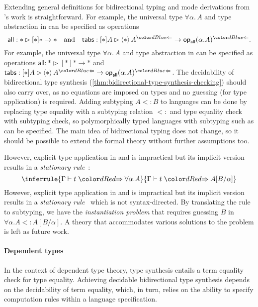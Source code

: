 Extending general definitions for bidirectional typing and mode derivations from \citeauthor{Hamana2011}'s work is straightforward. 
\ifarxiv
For example, the universal type $\forall \alpha.\, A$ and type abstraction in \SystemF can be specified as operations
\[
  \mathsf{all} : * \rhd [*] * \to *
  \quad\text{and}\quad
  \mathsf{tabs} : [*] A \rhd \left< * \right> A^{\chk} \to \tyOp_{\mathsf{all}}(\alpha. A)^{\chk}.
\]
\else
For example, the universal type $\forall \alpha.\, A$ and type abstraction in \SystemF can be specified as operations $\mathsf{all} : * \rhd [*] * \to *$ and $\mathsf{tabs} : [*] A \rhd \left< * \right> A^{\chk} \to \tyOp_{\mathsf{all}}(\alpha. A)^{\chk}$.
\fi
The decidability of bidirectional type synthesis (\cref{thm:bidirectional-type-synthesis-checking}) should also carry over, as no equations are imposed on types and no guessing (for type application) is required.
Adding subtyping $A \mathrel{<:} B$ to languages can be done by replacing type equality with a subtyping relation $\mathrel{<:}$ and type equality check with subtyping check, so polymorphically typed languages with subtyping such as \SystemFsub can be specified.
The main idea of bidirectional typing does not change, so it should be possible to extend the formal theory without further assumptions too.

\ifarxiv
However, explicit type application in \SystemF and \SystemFsub is impractical but its implicit version results in a \emph{stationary rule}~\cite{Leivant1986}:
\[
  \inferrule{\Gamma \vdash t \syn \forall \alpha. A}{\Gamma \vdash t \syn A[B/\alpha]}
\]
\else
However, explicit type application in \SystemF and \SystemFsub is impractical but its implicit version results in a \emph{stationary rule}~\cite{Leivant1986}
\fi
which is not syntax-directed.
By translating the rule to subtyping, we have the \emph{instantiation problem} that requires guessing $B$ in $\forall \alpha. A <: A[B/\alpha]$.
A theory that accommodates various solutions to the problem is left as future work.

\paragraph{Dependent types}
In the context of dependent type theory, type synthesis entails a term equality check for type equality.
Achieving decidable bidirectional type synthesis depends on the decidability of term equality, which, in turn, relies on the ability to specify computation rules within a language specification.

